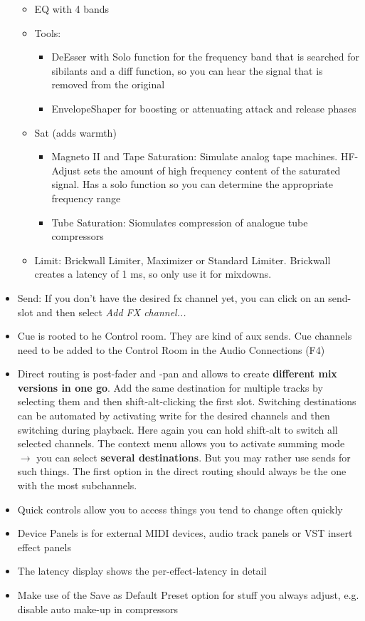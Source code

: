 \documentclass[10pt]{article}
\begin{document}
\begin{itemize}
\begin{itemize}
		\item EQ with 4 bands
		\item Tools:
		\begin{itemize}
			\item DeEsser with Solo function for the frequency band that is searched for sibilants and a diff function, so you can hear the signal that is removed from the original
			\item EnvelopeShaper for boosting or attenuating attack and release phases
		\end{itemize}
		\item Sat (adds warmth)
		\begin{itemize}
			\item Magneto II and Tape Saturation: Simulate analog tape machines. HF-Adjust sets the amount of high frequency content of the saturated signal. Has a solo function so you can determine the appropriate frequency range
			\item Tube Saturation: Siomulates compression of analogue tube compressors
		\end{itemize}
		\item Limit: Brickwall Limiter, Maximizer or Standard Limiter. Brickwall creates a latency of 1 ms, so only use it for mixdowns.
	\end{itemize}
	\item Send: If you don't have the desired fx channel yet, you can click on an send-slot and then select \textit{Add FX channel...}
	\item Cue is rooted to he Control room. They are kind of aux sends. Cue channels need to be added to the Control Room in the Audio Connections (F4)
	\item Direct routing is post-fader and -pan and allows to create \textbf{different mix versions in one go}. Add the same destination for multiple tracks by selecting them and then shift-alt-clicking the first slot. Switching destinations can be automated by activating write for the desired channels and then switching during playback. Here again you can hold shift-alt to switch all selected channels. The context menu allows you to activate summing mode $\rightarrow$ you can select \textbf{several destinations}. But you may rather use sends for such things. The first option in the direct routing should always be the one with the most subchannels.
	\item Quick controls allow you to access things you tend to change often quickly
	\item Device Panels is for external MIDI devices, audio track panels or VST insert effect panels
	\item The latency display shows the per-effect-latency in detail
	\item Make use of the Save as Default Preset option for stuff you always adjust, e.g. disable auto make-up in compressors
\end{itemize}
\end{document}
